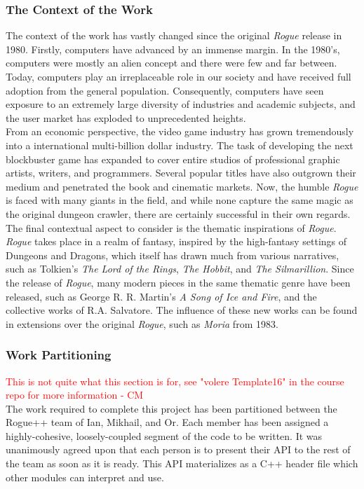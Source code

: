 \documentclass[12pt, titlepage]{article}
\begin{document}
		\subsubsection{The Context of the Work}

		The context of the work has vastly changed since the original \textit{Rogue} release in 1980.  Firstly, computers have advanced by an immense margin.  In the 1980's, computers were mostly an alien concept and there were few and far between.  Today, computers play an irreplaceable role in our society and have received full adoption from the general population.  Consequently, computers have seen exposure to an extremely large diversity of industries and academic subjects, and the user market has exploded to unprecedented heights.\\

		From an economic perspective, the video game industry has grown tremendously into a international multi-billion dollar industry.  The task of developing the next blockbuster game has expanded to cover entire studios of professional graphic artists, writers, and programmers.  Several popular titles have also outgrown their medium and penetrated the book and cinematic markets.  Now, the humble \textit{Rogue} is faced with many giants in the field, and while none capture the same magic as the original dungeon crawler, there are certainly successful in their own regards.\\

		The final contextual aspect to consider is the thematic inspirations of \textit{Rogue}. \textit{Rogue} takes place in a realm of fantasy, inspired by the high-fantasy settings of Dungeons and Dragons, which itself has drawn much from various narratives, such as Tolkien's \textit{The Lord of the Rings}, \textit{The Hobbit}, and \textit{The Silmarillion}.  Since the release of \textit{Rogue}, many modern pieces in the same thematic genre have been released, such as George R. R. Martin's \textit{A Song of Ice and Fire}, and the collective works of R.A. Salvatore.  The influence of these new works can be found in extensions over the original \textit{Rogue}, such as \textit{Moria} from 1983.

		\subsubsection{Work Partitioning}
		\textcolor{red}{ This is not quite what this section is for, see "volere Template16" in the course repo for more information - CM} \\
		The work required to complete this project has been partitioned between the Rogue++ team of Ian, Mikhail, and Or.  Each member has been assigned a highly-cohesive, loosely-coupled segment of the code to be written.  It was unanimously agreed upon that each person is to present their API to the rest of the team as soon as it is ready. This API materializes as a C++ header file which other modules can interpret and use.\\
\end{document}
